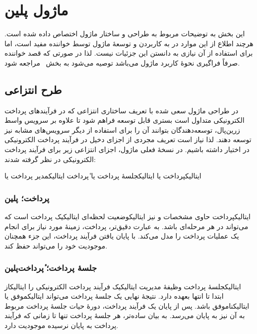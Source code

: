 \section{ماژول ‌پلین{}}
\label{بخش:ماژول}

این بخش به توضیحات مربوط به طراحی و ساختار
ماژول  اختصاص داده شده است. هرچند اطلاع
از این موارد در به کاربردن و توسعهٔ ماژول توسط
خواننده مفید است، اما برای استفاده از آن نیازی به
دانستن این جزئیات نیست. لذا در صورتی که قصد
خواننده صرفاً فراگیری نحوهٔ کاربرد ماژول می‌باشد
توصیه می‌شود به بخش~ مراجعه شود.

\subsection{طرح انتزاعی}
در طراحی ماژول سعی شده با تعریف ساختاری انتزاعی
که در فرآیندهای پرداخت الکترونیکی متداول است
بستری قابل توسعه فراهم شود تا علاوه بر سرویس واسط
زرین‌پال، توسعه‌دهندگان بتوانند آن را برای 
استفاده از دیگر سرویس‌های مشابه نیز توسعه دهند.
لذا نیاز است تعریف مجردی از اجزای دخیل در
فرآیند پرداخت الکترونیکی در اختیار داشته باشیم.
در نسخهٔ فعلی ماژول، اجزای انتزاعی زیر برای فرآیند 
پرداخت الکترونیکی در نظر گرفته شدند:
\begin{itemize}
	 ‌ایتالیک{پرداخت} یا 
	 ‌ایتالیک{جلسهٔ پرداخت} یا ٔ‌پرداخت{}
	 ‌ایتالیک{مدیر پرداخت} یا 
\end{itemize}


\subsubsection{پرداخت؛ ‌پلین{}}
‌ایتالیک{پرداخت} حاوی مشخصات و نیز
‌ایتالیک{وضعیت لحظه‌ای} ‌ایتالیک{یک}
پرداخت است که می‌تواند در هر مرحله‌ای باشد.
به عبارت دقیق‌تر، پرداخت، زمینهٔ
مورد نیاز برای انجام یک عملیات پرداخت
را مدل می‌کند. با پایان یافتن فرآیند پرداخت،
این جزء همچنان موجودیت خود را می‌تواند حفظ کند. 

\subsubsection{جلسهٔ پرداخت؛ ٔ‌پرداخت‌پلین{}}
‌ایتالیک{جلسهٔ پرداخت} وظیفهٔ مدیریت
‌ایتالیک{یک} فرآیند پرداخت الکترونیکی را
‌ایتالیک{از ابتدا تا انتها} بعهده دارد.
نتیجهٔ نهایی یک جلسهٔ پرداخت می‌تواند
‌ایتالیک{موفق} یا ‌ایتالیک{ناموفق} باشد. 
پس از پایان یک فرآیند پرداخت، دورهٔ حیات
جلسهٔ پرداخت مربوط به آن نیز به پایان می‌رسد.
به بیان ساده‌تر، هر جلسهٔ پرداخت تنها تا زمانی
که فرآیند پرداخت به پایان نرسیده موجودیت دارد.


